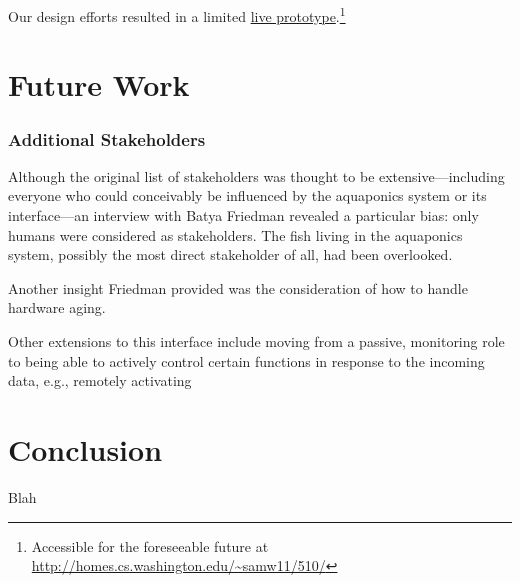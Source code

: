 \documentclass{sigchi}
\begin{document}
Our design efforts resulted in a limited \href{http://homes.cs.washington.edu/~samw11/510/}{live prototype}.\footnote{Accessible for the foreseeable future at \url{http://homes.cs.washington.edu/~samw11/510/}}

\section{Future Work}

\subsubsection{Additional Stakeholders}
Although the original list of stakeholders was thought to be extensive---including everyone who could conceivably be influenced by the aquaponics system or its interface---an interview with Batya Friedman revealed a particular bias: only humans were considered as stakeholders. The fish living in the aquaponics system, possibly the most direct stakeholder of all, had been overlooked. 

Another insight Friedman provided was the consideration of how to handle hardware aging. 

Other extensions to this interface include moving from a passive, monitoring role to being able to actively control certain functions in response to the incoming data, e.g., remotely activating 

\section{Conclusion}

Blah

%
%
%
%
%
\balance



\end{document}
